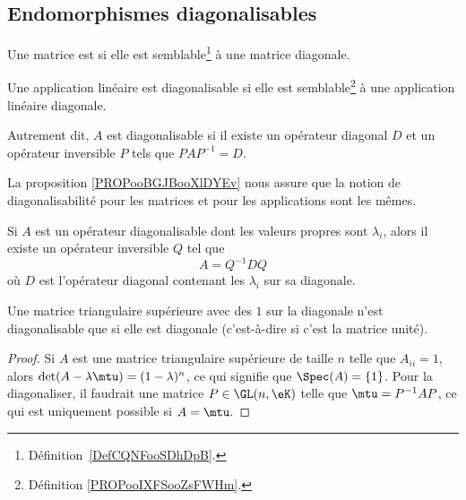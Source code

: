 \subsection{Endomorphismes diagonalisables}

\begin{definition}  \label{DefCNJqsmo}
	Une matrice est  si elle est semblable\footnote{Définition~\ref{DefCQNFooSDhDpB}.} à une matrice diagonale.

	Une application linéaire est diagonalisable si elle est semblable\footnote{Définition \ref{PROPooIXFSooZsFWHm}.} à une application linéaire diagonale.

    Autrement dit, \( A\) est diagonalisable si il existe un opérateur diagonal \( D\) et un opérateur inversible \( P\) tels que \( PAP^{-1}=D\).
\end{definition}

La proposition \ref{PROPooBGJBooXlDYEv} nous assure que la notion de diagonalisabilité pour les matrices et pour les applications sont les mêmes.

\begin{proposition}     \label{PROPooDEETooSOMiGO}
	Si \( A\) est un opérateur diagonalisable dont les valeurs propres sont \( \lambda_i\), alors il existe un opérateur inversible \( Q\) tel que
	\begin{equation}
		A=Q^{-1} DQ
	\end{equation}
	où \( D \) est l'opérateur diagonal contenant les \( \lambda_i\) sur sa diagonale.
\end{proposition}

\begin{lemma}
	Une matrice triangulaire supérieure avec des \( 1\) sur la diagonale n'est diagonalisable que si elle est diagonale (c'est-à-dire si c'est la matrice unité).
\end{lemma}

\begin{proof}
	Si \( A\) est une matrice triangulaire supérieure de taille \( n\) telle que \( A_{ii}=1\), alors \( \det(A-\lambda\mtu)=(1-\lambda)^n\), ce qui signifie que \( \Spec(A)=\{ 1 \}\). Pour la diagonaliser, il faudrait une matrice \( P\in\GL(n,\eK)\) telle que \( \mtu=P^{-1}AP\), ce qui est uniquement possible si \( A=\mtu\).
\end{proof}

